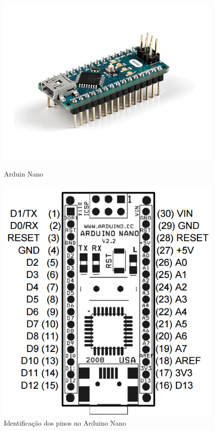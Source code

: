 \begin{figure}[h]
	\centering
	\begin{minipage}[b]{0.5\textwidth}
		\includegraphics[width=\textwidth]{img/hardware/nano-img.jpg}
		\caption{Arduin Nano}
		\label{ard2}
	\end{minipage}
	\hfill
	\begin{minipage}[b]{0.3\textwidth}
		\includegraphics[width=\textwidth]{img/hardware/nano-esquema.png}
		\caption{Identificação dos pinos no Arduino Nano}
		\label{ard1}
	\end{minipage}
\end{figure}








